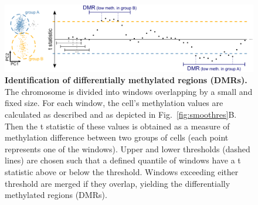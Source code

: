 \documentclass[10pt]{article}
\begin{document}
\begin{figure}[p]
	\begin{center}
		\includegraphics[width=.75\textwidth]{figures/Fig_DMRdetection.png}
	\end{center}
	\caption{\small \textbf{Identification of differentially methylated regions (DMRs).}\\
		The chromosome is divided into windows overlapping by a small and fixed size.
		For each window, the cell’s methylation values are calculated as described and as depicted in Fig.~\ref{fig:smoothres}B.
		Then the t statistic of these values is obtained as a measure of methylation difference between two groups of cells (each point represents one of the windows).
		Upper and lower thresholds (dashed lines) are chosen such that a defined quantile of windows have a t statistic above or below the threshold.
		Windows exceeding either threshold are merged if they overlap, yielding the differentially methylated regions (DMRs).}
	\label{fig:dmrscan}
\end{figure}
\end{document}
